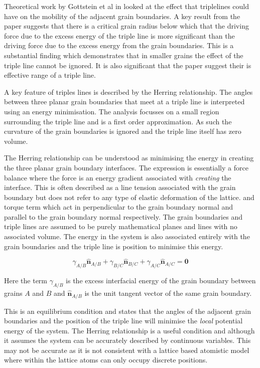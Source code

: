 \documentclass[12pt,a4paper]{book}
\begin{document}
Theoretical work by Gottstein et al in \cite{GOTTSTEIN2010914} looked at the effect that triplelines could have on the mobility of the adjacent grain boundaries. A key result from the paper suggests that there is a critical grain radius below which that the driving force due to the excess energy of the triple line is more significant than the driving force due to the excess energy from the grain boundaries. This is a substantial finding which demonstrates that in smaller grains the effect of the triple line cannot be ignored. It is also significant that the paper suggest their is effective range of a triple line. 

A key feature of triples lines is described by the Herring relationship. The angles between three planar grain boundaries that meet at a triple line is interpreted using an energy minimisation. The analysis focusses on a small region surrounding
the triple line and is a first order approximation. As such the curvature of the grain boundaries is ignored and the triple line itself has zero volume.

The Herring relationship can be understood as minimising the energy in creating the three planar grain boundary interfaces. The expression is essentially a force balance where the force is an energy gradient associated with \emph{creating} the interface. This is often described as a line tension associated with the grain boundary but does not refer to any type of elastic deformation of the lattice. and torque term which act in perpendicular to the grain boundary normal and parallel to the grain boundary normal respectively. The grain boundaries and triple lines are assumed to be purely mathematical planes and lines with no associated volume. The energy in the system is also associated entirely with the grain boundaries and the triple line is position to minimise this energy. 

\[\gamma_{A/B}\mathbf{\hat{n}}_{A/B} + \gamma_{B/C}\mathbf{\hat{n}}_{B/C} + \gamma_{A/C}\mathbf{\hat{n}}_{A/C} =\mathbf{0} \]

Here the term $\gamma_{A/B}$ is the excess interfacial energy of the grain boundary between grains $A$ and $B$ and $\mathbf{\hat{n}}_{A/B}$ is the unit tangent vector of the same grain boundary.

This is an equilibrium condition and states that the angles of the adjacent grain boundaries and the position of the triple line will minimise the \emph{local} potential energy of the system. The Herring relationship is a useful condition and although it assumes the system can be accurately described by continuous variables. This may not be accurate as it is not consistent with a lattice based atomistic model where within the lattice atoms can only occupy discrete positions.     
\end{document}
